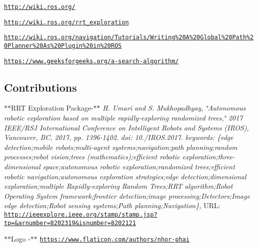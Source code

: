 \begin{DoxyItemize}
\item \href{http://wiki.ros.org/}{\tt http\+://wiki.\+ros.\+org/}
\item \href{http://wiki.ros.org/rrt_exploration}{\tt http\+://wiki.\+ros.\+org/rrt\+\_\+exploration}
\item \href{http://wiki.ros.org/navigation/Tutorials/Writing%20A%20Global%20Path%20Planner%20As%20Plugin%20in%20ROS}{\tt http\+://wiki.\+ros.\+org/navigation/\+Tutorials/\+Writing\%20\+A\%20\+Global\%20\+Path\%20\+Planner\%20\+As\%20\+Plugin\%20in\%20\+R\+OS}
\item \href{https://www.geeksforgeeks.org/a-search-algorithm/}{\tt https\+://www.\+geeksforgeeks.\+org/a-\/search-\/algorithm/}
\end{DoxyItemize}

\subsection*{Contributions}


\begin{DoxyItemize}
\item $\ast$$\ast$\+R\+RT Exploration Package-\/$\ast$$\ast$ {\itshape H. Umari and S. Mukhopadhyay, \char`\"{}\+Autonomous robotic exploration based on multiple rapidly-\/exploring randomized trees,\char`\"{} 2017 I\+E\+E\+E/\+R\+SJ International Conference on Intelligent Robots and Systems (I\+R\+OS), Vancouver, BC, 2017, pp. 1396-\/1402.} {\itshape doi\+: 10./\+I\+R\+OS.2017.} {\itshape keywords\+: \{edge detection;mobile robots;multi-\/agent systems;navigation;path planning;random processes;robot vision;trees (mathematics);efficient robotic exploration;three-\/dimensional space;autonomous robotic exploration;randomized trees;efficient robotic navigation;autonomous exploration strategies;edge detection;dimensional exploration;multiple Rapidly-\/exploring Random Trees;R\+RT algorithm;Robot Operating System framework;frontier detection;image processing;Detectors;Image edge detection;Robot sensing systems;Path planning;Navigation\},} U\+RL\+: \href{http://ieeexplore.ieee.org/stamp/stamp.jsp?tp=&arnumber=8202319&isnumber=8202121}{\tt http\+://ieeexplore.\+ieee.\+org/stamp/stamp.\+jsp?tp=\&arnumber=8202319\&isnumber=8202121}
\item $\ast$$\ast$\+Logo -\/$\ast$$\ast$ \href{https://www.flaticon.com/authors/nhor-phai}{\tt https\+://www.\+flaticon.\+com/authors/nhor-\/phai}
\end{DoxyItemize}

